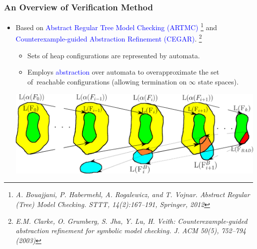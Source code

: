 \documentclass{beamer}
\newcommand{\hlbl}[1]{\textcolor{blue}{#1}}
\newcommand{\hlrd}[1]{\textcolor{red}{#1}}
\begin{document}
\begin{frame}
  \frametitle{An Overview of Verification Method}
   \begin{itemize}
	   \item Based on \hlbl{Abstract Regular Tree Model Checking (ARTMC)}
		   \footnote{\tiny{\textit{A. Bouajjani, P. Habermehl, A. Rogalewicz, and T. Vojnar. Abstract Regular (Tree) Model Checking. STTT, 14(2):167--191, Springer, 2012}}}
		   and \hlbl{Counterexample-guided Abstraction Refinement (CEGAR)}.
			\footnote{\tiny{\textit{E.M. Clarke, O. Grumberg, S. Jha, Y. Lu, H. Veith: Counterexample-guided abstraction refinement for symbolic model checking. J. ACM 50(5), 752–794 (2003)}}}
		\begin{itemize}
			\item Sets of heap configurations are represented by automata.
			\item Employs \hlbl{abstraction} over automata to overapproximate the set of~reachable configurations (allowing termination on $\infty$ state spaces).
		\end{itemize}
	   \vspace{0.2cm}
	   \includegraphics[scale=0.26]{artmc.png}
  \end{itemize}
\end{frame}
 
\end{document}
